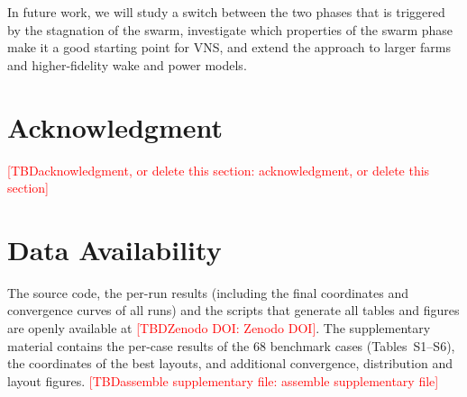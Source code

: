 \documentclass[journal,twoside]{IEEEtran}
\newcommand{\TBD}[1]{\textcolor{red}{[TBD\ifx\relax#1\relax\else: #1\fi]}}
\begin{document}
In future work, we will study a switch between the two phases that is triggered by the stagnation of the swarm, investigate which properties of the swarm phase make it a good starting point for VNS, and extend the approach to larger farms and higher-fidelity wake and power models.

\section*{Acknowledgment}
\TBD{acknowledgment, or delete this section}

\section*{Data Availability}
The source code, the per-run results (including the final coordinates and convergence curves of all runs) and the scripts that generate all tables and figures are openly available at \TBD{Zenodo DOI}. The supplementary material contains the per-case results of the 68 benchmark cases (Tables~S1--S6), the coordinates of the best layouts, and additional convergence, distribution and layout figures. \TBD{assemble supplementary file}
\end{document}
